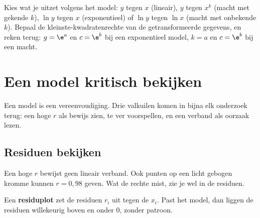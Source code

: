 \begin{werkwijze}
Kies wat je uitzet volgens het model: $y$ tegen $x$ (lineair), $y$ tegen $x^k$ (macht met gekende $k$), $\ln y$ tegen $x$ (exponentieel) of $\ln y$ tegen $\ln x$ (macht met onbekende $k$). Bepaal de kleinste-kwadratenrechte van de getransformeerde gegevens, en reken terug: $g = \e^a$ en $c = \e^b$ bij een exponentieel model, $k = a$ en $c = \e^b$ bij een macht.
\end{werkwijze}

\begin{oefeningen}
\end{oefeningen}

\section{Een model kritisch bekijken}

Een model is een vereenvoudiging. Drie valkuilen komen in bijna elk onderzoek terug: een hoge $r$ als bewijs zien, te ver voorspellen, en een verband als oorzaak lezen.

\subsection{Residuen bekijken}

Een hoge $r$ bewijst geen lineair verband. Ook punten op een licht gebogen kromme kunnen $r = 0{,}98$ geven. Wat de rechte mist, zie je wel in de residuen.

\begin{theorie}
Een \textbf{\textcolor{accent}{residuplot}} zet de residuen $r_i$ uit tegen de $x_i$. Past het model, dan liggen de residuen willekeurig boven en onder $0$, zonder patroon.
\end{theorie}

